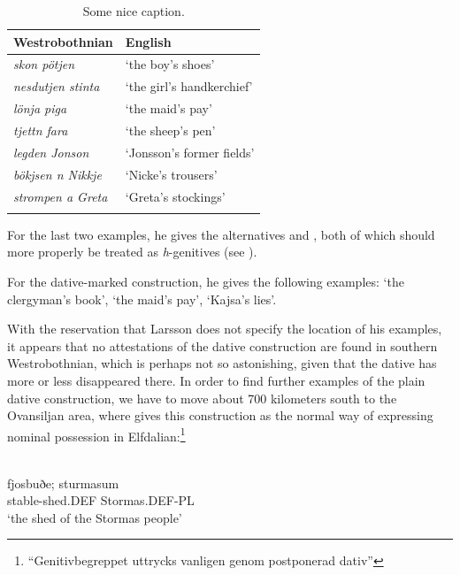 \begin{table}
\begin{tabular}{ll}
\lsptoprule Westrobothnian & English \\
\midrule 
\textit{skon pötjen} & ‘the boy’s shoes’\\ 
\textit{nesdutjen stinta} & ‘the girl’s handkerchief’\\ 
\textit{lönja piga} & ‘the maid’s pay’\\ 
\textit{tjettn fara} & ‘the sheep’s pen’\\ 
\textit{legden Jonson} & ‘Jonsson’s former fields’\\ 
\textit{bökjsen n Nikkje} & ‘Nicke’s trousers’\\ 
\textit{strompen a Greta} & ‘Greta’s stockings’\\
\lspbottomrule
\end{tabular}
\caption{Some nice caption.}
\label{tab:5.1}
\end{table} 


For the last two examples, he gives the alternatives  and , both of which should more properly be treated as \textit{h}{}-genitives (see ).

For the dative-marked construction, he gives the following examples:  ‘the clergyman’s book’,  ‘the maid’s pay’, ‘Kajsa’s lies’. 

With the reservation that Larsson does not specify the location of his examples, it appears that no attestations of the dative construction are found in southern Westrobothnian, which is perhaps not so astonishing, given that the dative has more or less disappeared there. In order to find further examples of the plain dative construction, we have to move about 700 kilometers south to the Ovansiljan area, where \citet[97]{Levander1909} gives this construction as the normal way of expressing nominal possession in Elfdalian:\footnote{ “Genitivbegreppet uttrycks vanligen genom postponerad dativ”}

\ea\label{}
\\
\gll fjosbuðe;  sturmasum\\
stable-shed.DEF  Stormas.DEF-PL\\
\glt ‘the shed of the Stormas people’
\z

